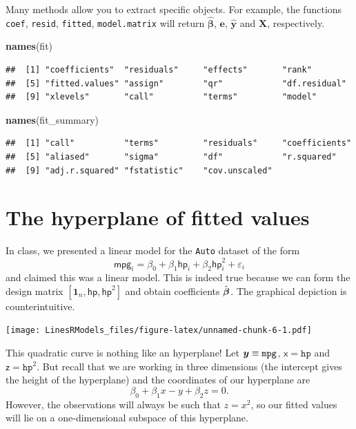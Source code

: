 \documentclass[]{book}
\newenvironment{Shaded}{\begin{snugshade}}{\end{snugshade}}
\newcommand{\KeywordTok}[1]{\textcolor[rgb]{0.13,0.29,0.53}{\textbf{#1}}}
\newcommand{\NormalTok}[1]{#1}
\theoremstyle{definition}
\theoremstyle{definition}
\theoremstyle{definition}
\theoremstyle{remark}
\begin{document}
Many methods allow you to extract specific objects. For example, the
functions \texttt{coef}, \texttt{resid}, \texttt{fitted},
\texttt{model.matrix} will return \(\hat{\boldsymbol{\beta}}\),
\(\boldsymbol{e}\), \(\hat{\boldsymbol{y}}\) and \(\mathbf{X}\),
respectively.

\begin{Shaded}
\begin{Highlighting}[]
\KeywordTok{names}\NormalTok{(fit)}
\end{Highlighting}
\end{Shaded}

\begin{verbatim}
##  [1] "coefficients"  "residuals"     "effects"       "rank"         
##  [5] "fitted.values" "assign"        "qr"            "df.residual"  
##  [9] "xlevels"       "call"          "terms"         "model"
\end{verbatim}

\begin{Shaded}
\begin{Highlighting}[]
\KeywordTok{names}\NormalTok{(fit_summary)}
\end{Highlighting}
\end{Shaded}

\begin{verbatim}
##  [1] "call"          "terms"         "residuals"     "coefficients" 
##  [5] "aliased"       "sigma"         "df"            "r.squared"    
##  [9] "adj.r.squared" "fstatistic"    "cov.unscaled"
\end{verbatim}

\section{The hyperplane of fitted
values}\label{the-hyperplane-of-fitted-values}

In class, we presented a linear model for the \texttt{Auto} dataset of
the form
\[\mathsf{mpg}_i = \beta_0 + \beta_1 \mathsf{hp}_i + \beta_2 \mathsf{hp}_i^2 + \varepsilon_i\]
and claimed this was a linear model. This is indeed true because we can
form the design matrix \([\mathbf{1}_n, \mathsf{hp}, \mathsf{hp}^2]\)
and obtain coefficients \(\hat{\boldsymbol{\beta}}\). The graphical depiction is
counterintuitive.

\texttt{[image: LinesRModels\_files/figure-latex/unnamed-chunk-6-1.pdf]}

This quadratic curve is nothing like an hyperplane! Let
\(\boldsymbol{y} \equiv \texttt{mpg}\), \(\mathsf{x} = \texttt{hp}\) and
\(\mathsf{z} = \texttt{hp}^2\). But recall that we are working in three
dimensions (the intercept gives the height of the hyperplane) and the
coordinates of our hyperplane are\\
\[\beta_0 + \beta_1x-y +\beta_2z =0.\] However, the observations will
always be such that \(z = x^2\), so our fitted values will lie on a
one-dimensional subspace of this hyperplane.
\end{document}
